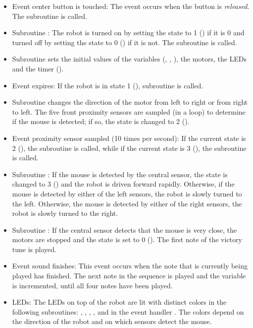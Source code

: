 \begin{itemize}

\item Event center button is touched: The event occurs when the button
is \emph{released}. The subroutine  is called.

\item Subroutine : The robot is turned on by setting the
state to 1 () if it is 0 and turned off by setting the state
to 0 () if it is not. The subroutine  is
called.

\item Subroutine  sets the initial values of the variables
(, , ), the motors, the LEDs and
the timer ().

\item Event  expires: If the robot is in state 1
(), subroutine  is called.

\item Subroutine  changes the direction of the motor from left
to right or from right to left. The five front proximity sensors are
sampled (in a loop) to determine if the mouse is detected; if so, the
state is changed to 2 ().

\item Event proximity sensor sampled (10 times per second): If the
current state is 2 (), the subroutine  is
called, while if the current state is 3 (), the subroutine
 is called.

\item Subroutine : If the mouse is detected by the central
sensor, the state is changed to 3 () and the robot is driven
forward rapidly. Otherwise, if the mouse is detected by either of the
left sensors, the robot is slowly turned to the left. Otherwise, the
mouse is detected by either of the right sensors, the robot is slowly
turned to the right.

\item Subroutine : If the central sensor detects that the
mouse is very close, the motors are stopped and the state is set to 0
(). The first note of the victory tune is played.

\item Event sound finishes: This event occurs when the note that is
currently being played has finished. The next note in the sequence is
played and the variable  is incremented, until all four
notes have been played.

\item LEDs: The LEDs on top of the robot are lit with distinct colors in
the following subroutines: , , ,
, and in the event handler . The colors
depend on the direction of the robot and on which sensors detect the
mouse.

\end{itemize}

